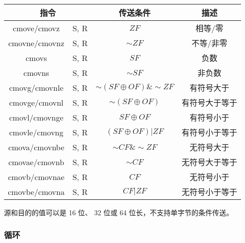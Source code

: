 \begin{table}[H]
    \centering
    \begin{tabular}{|c c|c|c|}
        \hline
        \multicolumn{2}{|c|}{\textbf{指令}} & \textbf{传送条件} & \textbf{描述}                                \\
        \hline
        cmove/cmovz                       & S, R          & $ZF$                             & 相等/零    \\
        cmovne/cmovnz                     & S, R          & $\sim ZF$                        & 不等/非零   \\
        \hline
        cmovs                             & S, R          & $SF$                             & 负数      \\
        cmovns                            & S, R          & $\sim SF$                        & 非负数     \\
        \hline
        cmovg/cmovnle                     & S, R          & $\sim (SF \oplus OF) \& \sim ZF$ & 有符号大于   \\
        cmovge/cmovnl                     & S, R          & $\sim (SF \oplus OF)$            & 有符号大于等于 \\
        cmovl/cmovnge                     & S, R          & $SF \oplus OF$                   & 有符号小于   \\
        cmovle/cmovng                     & S, R          & $(SF \oplus OF) | ZF$            & 有符号小于等于 \\
        \hline
        cmova/cmovnbe                     & S, R          & $\sim CF \& \sim ZF$             & 无符号大于   \\
        cmovae/cmovnb                     & S, R          & $\sim CF$                        & 无符号大于等于 \\
        cmovb/cmovnae                     & S, R          & $CF$                             & 无符号小于   \\
        cmovbe/cmovna                     & S, R          & $CF | ZF$                        & 无符号小于等于 \\
        \hline
    \end{tabular}
\end{table}

源和目的的值可以是 16 位、 32 位或 64 位长，不支持单字节的条件传送。

\subsubsection{循环}
